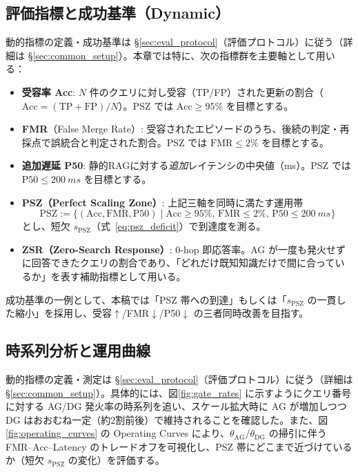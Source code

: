 \documentclass[ja=standard,xelatex]{bxjsarticle}
\begin{document}
\subsection{評価指標と成功基準（Dynamic）}
動的指標の定義・成功基準は \S\ref{sec:eval_protocol}（評価プロトコル）に従う（詳細は \S\ref{sec:common_setup}）。本章では特に、次の指標群を主要軸として用いる：
\begin{itemize}[leftmargin=1.6em]
  \item \textbf{受容率 Acc}: $N$ 件のクエリに対し受容（TP/FP）された更新の割合（$\mathrm{Acc}=(\mathrm{TP}+\mathrm{FP})/N$）。PSZ では $\mathrm{Acc}\ge 95\%$ を目標とする。
  \item \textbf{FMR}（False Merge Rate）: 受容されたエピソードのうち、後続の判定・再採点で誤統合と判定された割合。PSZ では $\mathrm{FMR}\le 2\%$ を目標とする。
  \item \textbf{追加遅延 P50}: 静的RAGに対する\emph{追加}レイテンシの中央値（ms）。PSZ では $\mathrm{P50}\le\SI{200}{ms}$ を目標とする。
  \item \textbf{PSZ（Perfect Scaling Zone）}: 上記三軸を同時に満たす運用帯
    \[
      \text{PSZ} := \bigl\{(\mathrm{Acc},\mathrm{FMR},\mathrm{P50}) \mid \mathrm{Acc}\ge 95\%,\,\mathrm{FMR}\le 2\%,\,\mathrm{P50}\le \SI{200}{ms}\bigr\}
    \]
    とし、短欠 $s_{\mathrm{PSZ}}$（式~\eqref{eq:psz_deficit}）で到達度を測る。
  \item \textbf{ZSR（Zero-Search Response）}: 0-hop 即応答率。AG が一度も発火せずに回答できたクエリの割合であり、「どれだけ既知知識だけで間に合っているか」を表す補助指標として用いる。
\end{itemize}
成功基準の一例として、本稿では「PSZ 帯への到達」もしくは「$s_{\mathrm{PSZ}}$ の一貫した縮小」を採用し、受容$\uparrow$/FMR$\downarrow$/P50$\downarrow$ の三者同時改善を目指す。

\subsection{時系列分析と運用曲線}
動的指標の定義・測定は \S\ref{sec:eval_protocol}（評価プロトコル）に従う（詳細は \S\ref{sec:common_setup}）。具体的には、図\ref{fig:gate_rates} に示すようにクエリ番号に対する AG/DG 発火率の時系列を追い、スケール拡大時に AG が増加しつつ DG はおおむね一定（約2割前後）で維持されることを確認した。また、図\ref{fig:operating_curves} の Operating Curves により、$\theta_{\mathrm{AG}}/\theta_{\mathrm{DG}}$ の掃引に伴う FMR–Acc–Latency のトレードオフを可視化し、PSZ 帯にどこまで近づけているか（短欠 $s_{\mathrm{PSZ}}$ の変化）を評価する。
\end{document}
